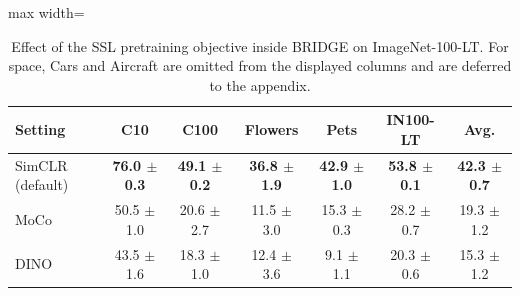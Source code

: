 \begin{table}[t]
\centering
\scriptsize
\setlength{\tabcolsep}{3.5pt}
\caption{Effect of the SSL pretraining objective inside BRIDGE on ImageNet-100-LT. For space, Cars and Aircraft are omitted from the displayed columns and are deferred to the appendix.}
\label{tab:main_ablation_pretraining}
\begin{adjustbox}{max width=\textwidth}
\begin{tabular}{l c c c c c c}
\toprule
Setting & C10 & C100 & Flowers & Pets & IN100-LT & Avg. \\
\midrule
SimCLR (default) & \textbf{76.0 {\scriptsize$\pm$ 0.3}} & \textbf{49.1 {\scriptsize$\pm$ 0.2}} & \textbf{36.8 {\scriptsize$\pm$ 1.9}} & \textbf{42.9 {\scriptsize$\pm$ 1.0}} & \textbf{53.8 {\scriptsize$\pm$ 0.1}} & \textbf{42.3 {\scriptsize$\pm$ 0.7}} \\
MoCo & 50.5 {\scriptsize$\pm$ 1.0} & 20.6 {\scriptsize$\pm$ 2.7} & 11.5 {\scriptsize$\pm$ 3.0} & 15.3 {\scriptsize$\pm$ 0.3} & 28.2 {\scriptsize$\pm$ 0.7} & 19.3 {\scriptsize$\pm$ 1.2} \\
DINO & 43.5 {\scriptsize$\pm$ 1.6} & 18.3 {\scriptsize$\pm$ 1.0} & 12.4 {\scriptsize$\pm$ 3.6} & 9.1 {\scriptsize$\pm$ 1.1} & 20.3 {\scriptsize$\pm$ 0.6} & 15.3 {\scriptsize$\pm$ 1.2} \\
\bottomrule
\end{tabular}
\end{adjustbox}
\end{table}
